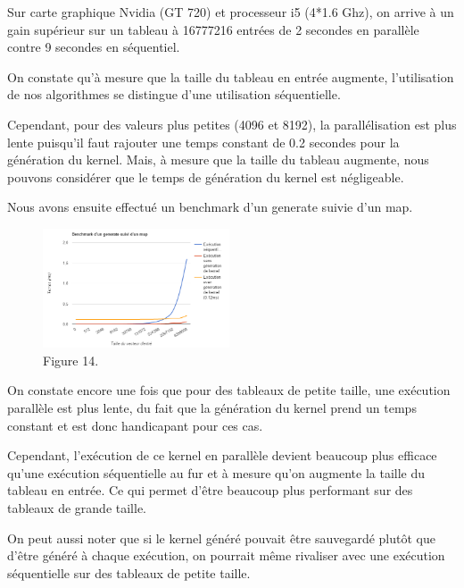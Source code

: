 \documentclass{report}
\begin{document}
Sur carte graphique Nvidia (GT 720) et processeur i5 (4*1.6 Ghz), on arrive à un gain supérieur sur un tableau à 16777216 entrées de 2 secondes en parallèle contre 9 secondes en séquentiel.\newline

On constate qu'à mesure que la taille du tableau en entrée augmente, l'utilisation de nos algorithmes se distingue d'une utilisation séquentielle.\newline

Cependant, pour des valeurs plus petites (4096 et 8192), la parallélisation est plus lente puisqu'il faut rajouter une temps constant de 0.2 secondes pour la génération du kernel. Mais, à mesure que la taille du tableau augmente, nous pouvons considérer que le temps de génération du kernel est négligeable.\newline

Nous avons ensuite effectué un benchmark d'un generate suivie d'un map.\newline
\begin{figure}[!h]
\begin{center}
\includegraphics[height=100pt]{images_finales/benchmark.png}
\end{center}
\caption{Figure 14.}
\label{test14}
\end{figure}


On constate encore une fois que pour des tableaux de petite taille, une exécution parallèle est plus lente, du fait que la génération du kernel prend un temps constant et est donc handicapant pour ces cas.\newline

Cependant, l'exécution de ce kernel en parallèle devient beaucoup plus efficace qu'une exécution séquentielle au fur et à mesure qu'on augmente la taille du tableau en entrée. Ce qui permet d'être beaucoup plus performant sur des tableaux de grande taille.\newline

On peut aussi noter que si le kernel généré pouvait être sauvegardé plutôt que d'être généré à chaque exécution, on pourrait même rivaliser avec une exécution séquentielle sur des tableaux de petite taille.\newline
\end{document}
